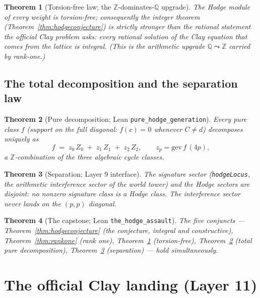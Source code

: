 \documentclass[11pt,a4paper]{article}
\theoremstyle{plain}
\newtheorem{theorem}{Theorem}[section]
\theoremstyle{definition}
\newcommand{\Z}{\mathbb{Z}}
\newcommand{\Q}{\mathbb{Q}}
\newcommand{\cycleClass}[1]{Z_{#1}}
\begin{document}
\begin{theorem}[Torsion-free law; the $\Z$-dominates-$\Q$ upgrade]
\label{thm:torsionfree}
The Hodge module of every weight is torsion-free; consequently the
\emph{integer} theorem (Theorem~\ref{thm:hodgeconjecture}) is strictly
stronger than the rational statement the official Clay problem asks: every
rational solution of the Clay equation that comes from the lattice is
integral. (This is the arithmetic upgrade
$\Q \leadsto \Z$ carried by rank-one.)
\end{theorem}

\subsection{The total decomposition and the separation law}

\begin{theorem}[Pure decomposition; Lean \texttt{pure\_hodge\_generation}]
\label{thm:pure}
Every \emph{pure} class $f$ (support on the full diagonal: $f(c)=0$ whenever
$C \ne d$) decomposes uniquely as
\[
  f \;=\; z_0\, \cycleClass{0} \;+\; z_1\, \cycleClass{1} \;+\;
  z_2\, \cycleClass{2},
  \qquad z_p = \mathrm{gev}\,f\,(4p),
\]
a $\Z$-combination of the three algebraic cycle classes.
\end{theorem}

\begin{theorem}[Separation; Layer 9 interface]
\label{thm:separation}
The signature sector (\texttt{hodgeLocus}, the arithmetic interference
sector of the world tower) and the Hodge sectors are disjoint: no
nonzero signature class is a Hodge class. The interference sector never
lands on the $(p,p)$ diagonal.
\end{theorem}

\begin{theorem}[The capstone; Lean \texttt{the\_hodge\_assault}]
The five conjuncts --- Theorem~\ref{thm:hodgeconjecture} (the conjecture,
integral and constructive), Theorem~\ref{thm:rankone} (rank one),
Theorem~\ref{thm:torsionfree} (torsion-free), Theorem~\ref{thm:pure}
(total pure decomposition), Theorem~\ref{thm:separation} (separation) ---
hold simultaneously.
\end{theorem}

\section{The official Clay landing (Layer 11)}\label{sec:clay}
\end{document}
